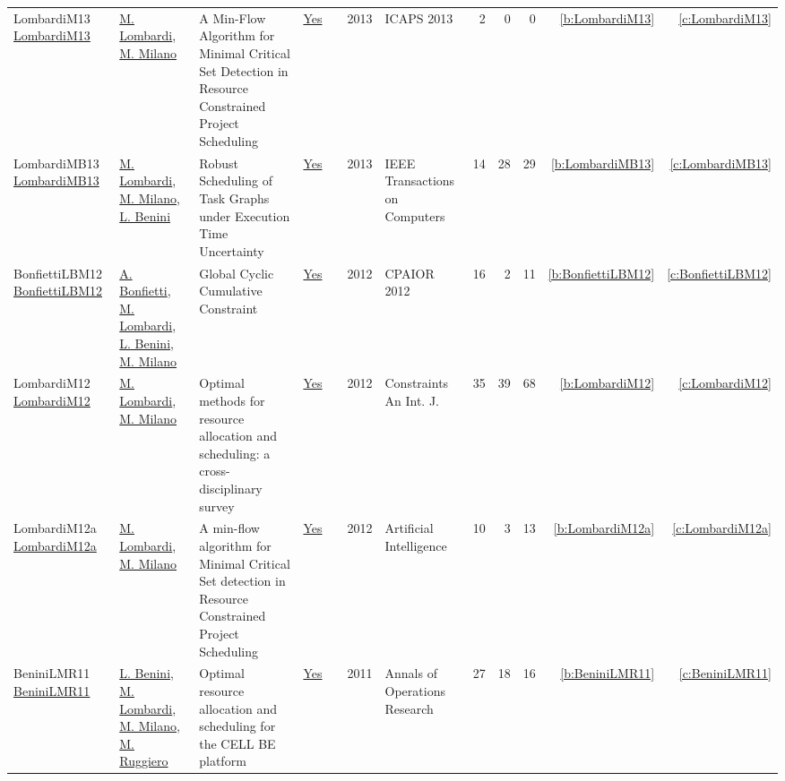 {\begin{longtable}{>{\raggedright\arraybackslash}p{3cm}>{\raggedright\arraybackslash}p{6cm}>{\raggedright\arraybackslash}p{6.5cm}rrrp{2.5cm}rrrrr}
LombardiM13 \href{http://www.aaai.org/ocs/index.php/ICAPS/ICAPS13/paper/view/6052}{LombardiM13} & \hyperref[auth:a143]{M. Lombardi}, \hyperref[auth:a144]{M. Milano} & A Min-Flow Algorithm for Minimal Critical Set Detection in Resource Constrained Project Scheduling & \href{works/LombardiM13.pdf}{Yes} & \cite{LombardiM13} & 2013 & ICAPS 2013 & 2 & 0 & 0 & \ref{b:LombardiM13} & \ref{c:LombardiM13}\\
LombardiMB13 \href{http://dx.doi.org/10.1109/tc.2011.203}{LombardiMB13} & \hyperref[auth:a143]{M. Lombardi}, \hyperref[auth:a144]{M. Milano}, \hyperref[auth:a248]{L. Benini} & Robust Scheduling of Task Graphs under Execution Time Uncertainty & \href{works/LombardiMB13.pdf}{Yes} & \cite{LombardiMB13} & 2013 & IEEE Transactions on Computers & 14 & 28 & 29 & \ref{b:LombardiMB13} & \ref{c:LombardiMB13}\\
BonfiettiLBM12 \href{https://doi.org/10.1007/978-3-642-29828-8\_6}{BonfiettiLBM12} & \hyperref[auth:a204]{A. Bonfietti}, \hyperref[auth:a143]{M. Lombardi}, \hyperref[auth:a248]{L. Benini}, \hyperref[auth:a144]{M. Milano} & Global Cyclic Cumulative Constraint & \href{works/BonfiettiLBM12.pdf}{Yes} & \cite{BonfiettiLBM12} & 2012 & CPAIOR 2012 & 16 & 2 & 11 & \ref{b:BonfiettiLBM12} & \ref{c:BonfiettiLBM12}\\
LombardiM12 \href{https://doi.org/10.1007/s10601-011-9115-6}{LombardiM12} & \hyperref[auth:a143]{M. Lombardi}, \hyperref[auth:a144]{M. Milano} & Optimal methods for resource allocation and scheduling: a cross-disciplinary survey & \href{works/LombardiM12.pdf}{Yes} & \cite{LombardiM12} & 2012 & Constraints An Int. J. & 35 & 39 & 68 & \ref{b:LombardiM12} & \ref{c:LombardiM12}\\
LombardiM12a \href{https://doi.org/10.1016/j.artint.2011.12.001}{LombardiM12a} & \hyperref[auth:a143]{M. Lombardi}, \hyperref[auth:a144]{M. Milano} & A min-flow algorithm for Minimal Critical Set detection in Resource Constrained Project Scheduling & \href{works/LombardiM12a.pdf}{Yes} & \cite{LombardiM12a} & 2012 & Artificial Intelligence & 10 & 3 & 13 & \ref{b:LombardiM12a} & \ref{c:LombardiM12a}\\
BeniniLMR11 \href{https://doi.org/10.1007/s10479-010-0718-x}{BeniniLMR11} & \hyperref[auth:a248]{L. Benini}, \hyperref[auth:a143]{M. Lombardi}, \hyperref[auth:a144]{M. Milano}, \hyperref[auth:a727]{M. Ruggiero} & Optimal resource allocation and scheduling for the {CELL} {BE} platform & \href{works/BeniniLMR11.pdf}{Yes} & \cite{BeniniLMR11} & 2011 & Annals of Operations Research & 27 & 18 & 16 & \ref{b:BeniniLMR11} & \ref{c:BeniniLMR11}\\

\end{longtable}}
